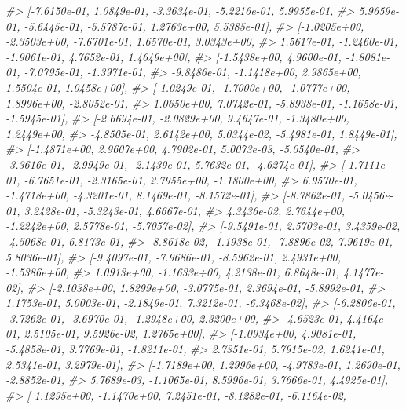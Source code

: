 \documentclass[]{book}
\newenvironment{Shaded}{\begin{snugshade}}{\end{snugshade}}
\newcommand{\CommentTok}[1]{\textcolor[rgb]{0.56,0.35,0.01}{\textit{#1}}}
\begin{document}
\begin{Shaded}
\begin{Highlighting}[]
\CommentTok{#>         [-7.6150e-01,  1.0849e-01, -3.3634e-01, -5.2216e-01,  5.9955e-01,}
\CommentTok{#>           5.9659e-01, -5.6445e-01, -5.5787e-01,  1.2763e+00,  5.5385e-01],}
\CommentTok{#>         [-1.0205e+00, -2.3503e+00, -7.6701e-01,  1.6570e-01,  3.0343e+00,}
\CommentTok{#>           1.5617e-01, -1.2460e-01, -1.9061e-01,  4.7652e-01,  1.4649e+00],}
\CommentTok{#>         [-1.5438e+00,  4.9600e-01, -1.8081e-01, -7.0795e-01, -1.3971e-01,}
\CommentTok{#>          -9.8486e-01, -1.1418e+00,  2.9865e+00,  1.5504e-01,  1.0458e+00],}
\CommentTok{#>         [ 1.0249e-01, -1.7000e+00, -1.0777e+00,  1.8996e+00, -2.8052e-01,}
\CommentTok{#>           1.0650e+00,  7.0742e-01, -5.8938e-01, -1.1658e-01, -1.5945e-01],}
\CommentTok{#>         [-2.6694e-01, -2.0829e+00,  9.4647e-01, -1.3480e+00,  1.2449e+00,}
\CommentTok{#>          -4.8505e-01,  2.6142e+00,  5.0344e-02, -5.4981e-01,  1.8449e-01],}
\CommentTok{#>         [-1.4871e+00,  2.9607e+00,  4.7902e-01,  5.0073e-03, -5.0540e-01,}
\CommentTok{#>          -3.3616e-01, -2.9949e-01, -2.1439e-01,  5.7632e-01, -4.6274e-01],}
\CommentTok{#>         [ 1.7111e-01, -6.7651e-01, -2.3165e-01,  2.7955e+00, -1.1800e+00,}
\CommentTok{#>           6.9570e-01, -1.4718e+00, -4.3201e-01,  8.1469e-01, -8.1572e-01],}
\CommentTok{#>         [-8.7862e-01, -5.0456e-01,  3.2428e-01, -5.3243e-01,  4.6667e-01,}
\CommentTok{#>           4.3436e-02,  2.7644e+00, -1.2242e+00,  2.5778e-01, -5.7057e-02],}
\CommentTok{#>         [-9.5491e-01,  2.5703e-01,  3.4359e-02, -4.5068e-01,  6.8173e-01,}
\CommentTok{#>          -8.8618e-02, -1.1938e-01, -7.8896e-02,  7.9619e-01,  5.8036e-01],}
\CommentTok{#>         [-9.4097e-01, -7.9686e-01, -8.5962e-01,  2.4931e+00, -1.5386e+00,}
\CommentTok{#>           1.0913e+00, -1.1633e+00,  4.2138e-01,  6.8648e-01,  4.1477e-02],}
\CommentTok{#>         [-2.1038e+00,  1.8299e+00, -3.0775e-01,  2.3694e-01, -5.8992e-01,}
\CommentTok{#>           1.1753e-01,  5.0003e-01, -2.1849e-01,  7.3212e-01, -6.3468e-02],}
\CommentTok{#>         [-6.2806e-01, -3.7262e-01, -3.6970e-01, -1.2948e+00,  2.3200e+00,}
\CommentTok{#>          -4.6523e-01,  4.4164e-01,  2.5105e-01,  9.5926e-02,  1.2765e+00],}
\CommentTok{#>         [-1.0934e+00,  4.9081e-01, -5.4858e-01,  3.7769e-01, -1.8211e-01,}
\CommentTok{#>           2.7351e-01,  5.7915e-02,  1.6241e-01,  2.5341e-01,  3.2979e-01],}
\CommentTok{#>         [-1.7189e+00,  1.2996e+00, -4.9783e-01,  1.2690e-01, -2.8852e-01,}
\CommentTok{#>           5.7689e-03, -1.1065e-01,  8.5996e-01,  3.7666e-01,  4.4925e-01],}
\CommentTok{#>         [ 1.1295e+00, -1.1470e+00,  7.2451e-01, -8.1282e-01, -6.1164e-02,}

\end{Highlighting}
\end{Shaded}
\end{document}
